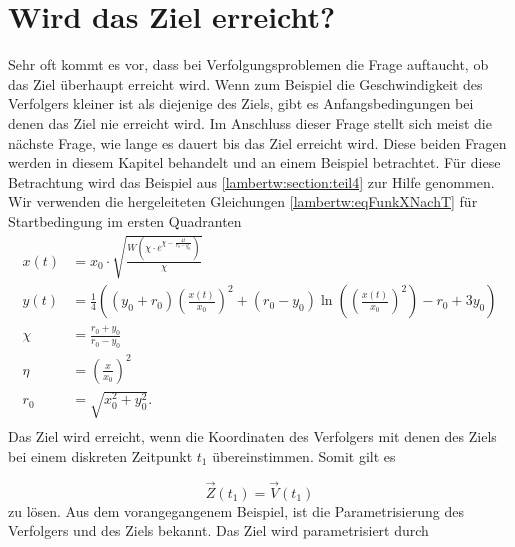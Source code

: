 %
%
%
\section{Wird das Ziel erreicht?
\label{lambertw:section:Wird_das_Ziel_erreicht}}

Sehr oft kommt es vor, dass bei Verfolgungsproblemen die Frage auftaucht, ob das Ziel überhaupt erreicht wird.
Wenn zum Beispiel die Geschwindigkeit des Verfolgers kleiner ist als diejenige des Ziels, gibt es Anfangsbedingungen bei denen das Ziel nie erreicht wird.
Im Anschluss dieser Frage stellt sich meist die nächste Frage, wie lange es dauert bis das Ziel erreicht wird.
Diese beiden Fragen werden in diesem Kapitel behandelt und an einem Beispiel betrachtet.
%
Für diese Betrachtung wird das Beispiel aus \eqref{lambertw:section:teil4} zur Hilfe genommen.
Wir verwenden die hergeleiteten Gleichungen \eqref{lambertw:eqFunkXNachT} für Startbedingung im ersten Quadranten
\begin{align*}
    x\left(t\right)
    &=
    x_0\cdot\sqrt{\frac{W\left(\chi\cdot e^{\chi-\frac{4t}{r_0-y_0}}\right)}{\chi}} \\
    y(t)
    &=
    \frac{1}{4}\left(\left(y_0+r_0\right)\left(\frac{x(t)}{x_0}\right)^2+\left(r_0-y_0\right)\operatorname{ln}\left(\left(\frac{x(t)}{x_0}\right)^2\right)-r_0+3y_0\right)\\
    \chi
    &=
    \frac{r_0+y_0}{r_0-y_0}\\
    \eta
    &=
    \left(\frac{x}{x_0}\right)^2\\
    r_0
    &=
    \sqrt{x_0^2+y_0^2} \text{.}\\
\end{align*}
%
Das Ziel wird erreicht, wenn die Koordinaten des Verfolgers mit denen des Ziels bei einem diskreten Zeitpunkt $t_1$ übereinstimmen.
Somit gilt es

\begin{equation*}
    \vec{Z}(t_1)=\vec{V}(t_1)
\end{equation*}
%
zu lösen.
Aus dem vorangegangenem Beispiel, ist die Parametrisierung des Verfolgers und des Ziels bekannt.
Das Ziel wird parametrisiert durch

